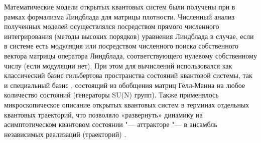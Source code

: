 {\methods} 
Математические модели открытых квантовых систем были получены при в рамках формализма Линдблада \autocite{book2007} для матрицы плотности.
Численный анализ полученных моделей осуществлялся посредством прямого численного интегрирования (методы высоких порядков) уравнения Линдблада в случае, если в системе есть модуляция или посредством численного поиска собственного вектора матрицы оператора Линдблада, соответствующего нулевому собственному числу  (если модуляции нет). При этом для вычислений использовался как классический базис гильбертова пространства состояний квантовой системы, так и специальный базис \cite{Liniov2019}, состоящий из обобщения матриц Гелл-Манна на любое количество состояний (генераторы SU(N) групп).
Также применялось микроскопическое описание открытых квантовых систем в терминах отдельных квантовых траекторий, что позволяло  «развернуть» динамику на асимптотическом квантовом состоянии "--- аттракторе "--- в ансамбль независимых реализаций (траекторий) \autocite{Plenio1998}.

